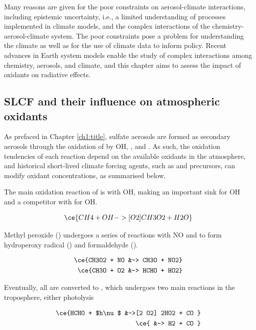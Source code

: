 Many reasons are given for the poor constraints on aerosol-climate interactions, including epistemic uncertainty, i.e., a limited understanding of processes implemented in climate models, and the complex interactions of the chemistry-aerosol-climate system. The poor constraints pose a problem for understanding the climate as well as for the use of climate data to inform policy. Recent advances in Earth system models enable the study of complex interactions among chemistry, aerosols, and climate, and this chapter aims to assess the impact of oxidants on radiative effects.


\subsection{SLCF and their influence on atmospheric oxidants}

As prefaced in Chapter \ref{ch1:title}, sulfate aerosols are formed as secondary aerosols through the oxidation of  by OH, , and . As such, the oxidation tendencies of each reaction depend on the available oxidants in the atmosphere, and historical short-lived climate forcing agents, such as  and  precursors, can modify oxidant concentrations, as summarised below.

The main oxidation reaction of  is with OH, making  an important sink for OH and a competitor with  for OH.

\begin{equation}
    \ce{CH4 + OH ->[O2] CH3O2 + H2O}
\end{equation}

Methyl peroxide () undergoes a series of reactions with NO and  to form hydroperoxy radical () and formaldehyde (). 

\begin{align}
    \ce{CH3O2 + NO &-> CH3O + NO2} \\
    \ce{CH3O + O2 &-> HCHO + HO2}
\end{align}

Eventually, all  are converted to , which undergoes two main reactions in the troposphere, either photolysis 

\begin{align}
    \ce{HCHO + $h\nu$ &->[2 O2] 2HO2 + CO } \\
    \ce{ &-> H2 + CO }
\end{align}

